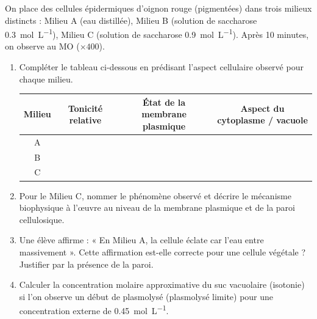 \documentclass[11pt]{article}
\begin{document}
\begin{exercice}
On place des cellules épidermiques d'oignon rouge (pigmentées) dans trois milieux distincts : Milieu A (eau distillée), Milieu B (solution de saccharose \SI{0,3}{mol.L^{-1}}), Milieu C (solution de saccharose \SI{0,9}{mol.L^{-1}}). Après 10 minutes, on observe au MO ($\times 400$).
\begin{enumerate}
    \item Compléter le tableau ci-dessous en prédisant l'aspect cellulaire observé pour chaque milieu.
    \begin{tabular}{|c|c|c|c|}
    \hline
    \textbf{Milieu} & \textbf{Tonicité relative} & \textbf{État de la membrane plasmique} & \textbf{Aspect du cytoplasme / vacuole} \\
    \hline
    A & & & \\
    \hline
    B & & & \\
    \hline
    C & & & \\
    \hline
    \end{tabular}
    \item Pour le Milieu C, nommer le phénomène observé et décrire le mécanisme biophysique à l'œuvre au niveau de la membrane plasmique et de la paroi cellulosique.
    \item Une élève affirme : « En Milieu A, la cellule éclate car l'eau entre massivement ». Cette affirmation est-elle correcte pour une cellule végétale ? Justifier par la présence de la paroi.
    \item Calculer la concentration molaire approximative du suc vacuolaire (isotonie) si l'on observe un début de plasmolysé (plasmolysé limite) pour une concentration externe de \SI{0,45}{mol.L^{-1}}.
\end{enumerate}
\end{exercice}
\end{document}
